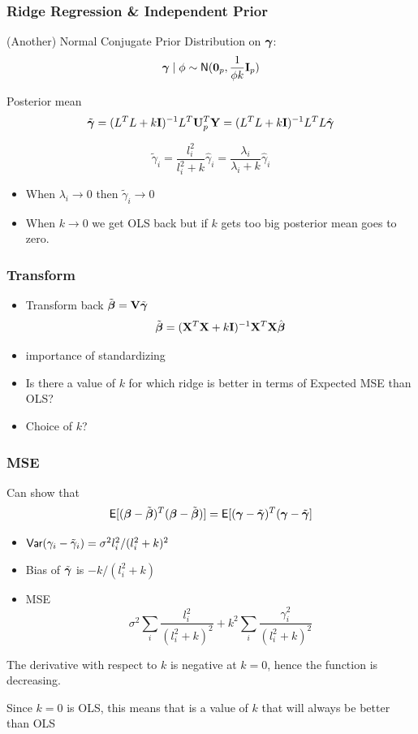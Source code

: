 \documentclass[handout]{beamer}
\begin{document}
\begin{frame}
  \frametitle{Ridge  Regression \& Independent Prior}
  (Another) Normal Conjugate Prior Distribution on $\boldsymbol{\gamma}$: $$\boldsymbol{\gamma} \mid \phi \sim \textsf{N}(\mathbf{0}_p, \frac{1}{ \phi
    k} \mathbf{I}_p)$$ \pause

Posterior mean
$$
 \tilde{\boldsymbol{\gamma}} =( L^TL + k \mathbf{I})^{-1} L^T \mathbf{U}^T_p\mathbf{Y}  = ( L^TL + k \mathbf{I})^{-1}
 L^TL\hat{\boldsymbol{\gamma}} 
$$\pause

 $$\tilde{\gamma}_i = \frac{l_i^2}{l_i^2 + k} \hat{\gamma}_i =
 \frac{\lambda_i}{\lambda_i + k} \hat{\gamma}_i $$ \pause
 \begin{itemize}
\item When $\lambda_i \to 0$ then $\tilde{\gamma}_i \to 0$

\item When $k \to 0$ we get OLS back but if $k$ gets too  big posterior
  mean goes to zero.
 \end{itemize}

\end{frame}
\begin{frame}
  \frametitle{Transform}
  \begin{itemize}
  \item 
  Transform back $\tilde{\boldsymbol{\beta}} = \mathbf{V} \tilde{\boldsymbol{\gamma}}$ \pause
  $$\tilde{\boldsymbol{\beta}} = (\mathbf{X}^T\mathbf{X} + k \mathbf{I})^{-1}  \mathbf{X}^T\mathbf{X} \hat{\boldsymbol{\beta}}$$ \pause
\item importance of standardizing \pause

\item Is there a value of $k$ for which ridge is better in terms of
  Expected MSE than OLS? \pause
\item Choice of $k$?
  \end{itemize}
\end{frame}
\begin{frame}\frametitle{MSE}
Can show that
 $$\textsf{E}[(\boldsymbol{\beta} - \tilde{\boldsymbol{\beta}})^T(\boldsymbol{\beta} - \tilde{\boldsymbol{\beta}})] = \textsf{E}[(\boldsymbol{\gamma} - \tilde{\boldsymbol{\gamma}})^T(\boldsymbol{\gamma} - \tilde{\boldsymbol{\gamma}}]$$
  \pause
 \begin{itemize}
 \item $\textsf{Var}(\gamma_i - \tilde{\gamma}_i) = \sigma^2 l_i^2 /(l_i^2 +
   k)^2$ \pause
\item  Bias of $\tilde{\boldsymbol{\gamma}}$ is $-k/(l_i^2 + k)$ \pause
 \item  MSE $$\sigma^2 \sum_i \frac{l_i^2}{(l_i^2 + k)^2} +  k^2 
   \sum_i \frac{\gamma_i^2} {(l_i^2 + k)^2} $$
 \end{itemize}
The derivative with respect to $k$ is negative at $k=0$, hence the
function is decreasing. \pause

\vspace{12pt}
Since $k = 0$ is OLS, this means that is a value of $k$ that will
always be better than OLS
\end{frame}
\end{document}
